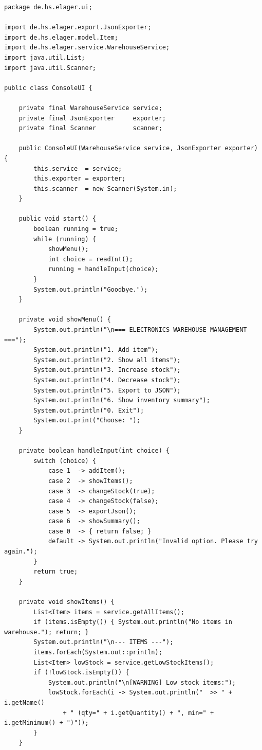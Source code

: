 \documentclass[12pt, a4paper, twoside]{report}
\begin{document}
\begin{lstlisting}[caption={ConsoleUI.java -- Präsentationsschicht (Auszug)}, label={lst:ui}]
package de.hs.elager.ui;

import de.hs.elager.export.JsonExporter;
import de.hs.elager.model.Item;
import de.hs.elager.service.WarehouseService;
import java.util.List;
import java.util.Scanner;

public class ConsoleUI {

    private final WarehouseService service;
    private final JsonExporter     exporter;
    private final Scanner          scanner;

    public ConsoleUI(WarehouseService service, JsonExporter exporter) {
        this.service  = service;
        this.exporter = exporter;
        this.scanner  = new Scanner(System.in);
    }

    public void start() {
        boolean running = true;
        while (running) {
            showMenu();
            int choice = readInt();
            running = handleInput(choice);
        }
        System.out.println("Goodbye.");
    }

    private void showMenu() {
        System.out.println("\n=== ELECTRONICS WAREHOUSE MANAGEMENT ===");
        System.out.println("1. Add item");
        System.out.println("2. Show all items");
        System.out.println("3. Increase stock");
        System.out.println("4. Decrease stock");
        System.out.println("5. Export to JSON");
        System.out.println("6. Show inventory summary");
        System.out.println("0. Exit");
        System.out.print("Choose: ");
    }

    private boolean handleInput(int choice) {
        switch (choice) {
            case 1  -> addItem();
            case 2  -> showItems();
            case 3  -> changeStock(true);
            case 4  -> changeStock(false);
            case 5  -> exportJson();
            case 6  -> showSummary();
            case 0  -> { return false; }
            default -> System.out.println("Invalid option. Please try again.");
        }
        return true;
    }

    private void showItems() {
        List<Item> items = service.getAllItems();
        if (items.isEmpty()) { System.out.println("No items in warehouse."); return; }
        System.out.println("\n--- ITEMS ---");
        items.forEach(System.out::println);
        List<Item> lowStock = service.getLowStockItems();
        if (!lowStock.isEmpty()) {
            System.out.println("\n[WARNING] Low stock items:");
            lowStock.forEach(i -> System.out.println("  >> " + i.getName()
                + " (qty=" + i.getQuantity() + ", min=" + i.getMinimum() + ")"));
        }
    }


\end{lstlisting}
\end{document}
